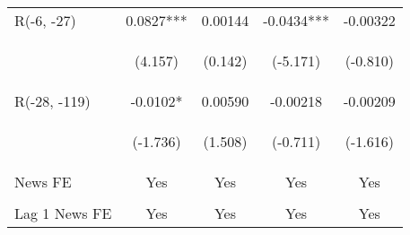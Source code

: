 \documentclass[border=0.2cm]{standalone}
\begin{document}
\begin{tabular}{lcccc}
    R(-6, -27)             & 0.0827***                                      & 0.00144                                        & -0.0434***                                     & -0.00322                                       \\
    \vspace{4pt}           & \begin{footnotesize}(4.157)\end{footnotesize}  & \begin{footnotesize}(0.142)\end{footnotesize}  & \begin{footnotesize}(-5.171)\end{footnotesize} & \begin{footnotesize}(-0.810)\end{footnotesize} \\
    R(-28, -119)           & -0.0102*                                       & 0.00590                                        & -0.00218                                       & -0.00209                                       \\
    \vspace{12pt}          & \begin{footnotesize}(-1.736)\end{footnotesize} & \begin{footnotesize}(1.508)\end{footnotesize}  & \begin{footnotesize}(-0.711)\end{footnotesize} & \begin{footnotesize}(-1.616)\end{footnotesize} \\
    News FE                & Yes                                            & Yes                                            & Yes                                            & Yes                                            \\
    \vspace{4pt}           &                                                &                                                &                                                &                                                \\
    Lag 1 News FE          & Yes                                            & Yes                                            & Yes                                            & Yes                                            \\

\end{tabular}
\end{document}
